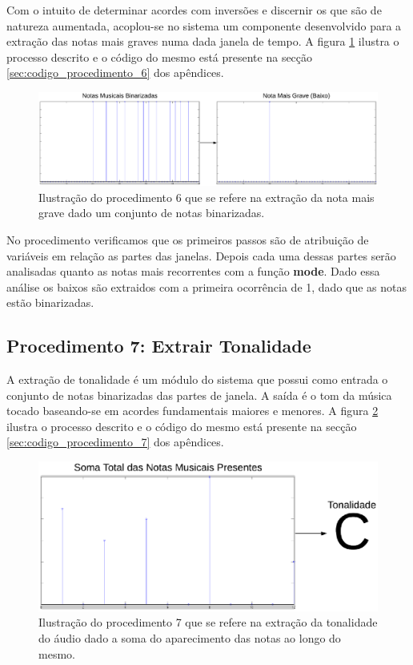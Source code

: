 Com o intuito de determinar acordes com inversões e discernir os que são de natureza aumentada, acoplou-se no sistema um componente desenvolvido para a extração das notas mais graves numa dada janela de tempo. A figura \ref{fig:procedimento_6} ilustra o processo descrito e o código do mesmo está presente na secção \ref{sec:codigo_procedimento_6} dos apêndices.

\begin{figure}[h] 
  \centering
    \includegraphics[keepaspectratio=true, scale=0.55]{figuras/procedimento_6}
    \caption{Ilustração do procedimento 6 que se refere na extração da nota mais grave dado um conjunto de notas binarizadas.}
    \label{fig:procedimento_6}
\end{figure}

No procedimento verificamos que os primeiros passos são de atribuição de variáveis em relação as partes das janelas. Depois cada uma dessas partes serão analisadas quanto as notas mais recorrentes com a função \textbf{mode}. Dado essa análise os baixos são extraidos com a primeira ocorrência de 1, dado que as notas estão binarizadas.

\subsection{Procedimento 7: Extrair Tonalidade}
\label{subsec:procedimento_7}

A extração de tonalidade é um módulo do sistema que possui como entrada o conjunto de notas binarizadas das partes de janela. A saída é o tom da música tocado baseando-se em acordes fundamentais maiores e menores. A figura \ref{fig:procedimento_7} ilustra o processo descrito e o código do mesmo está presente na secção \ref{sec:codigo_procedimento_7} dos apêndices. 

\begin{figure}[h] 
  \centering
    \includegraphics[keepaspectratio=true, scale=0.55]{figuras/procedimento_7}
    \caption{Ilustração do procedimento 7 que se refere na extração da tonalidade do áudio dado a soma do aparecimento das notas ao longo do mesmo.}
    \label{fig:procedimento_7}
\end{figure}

